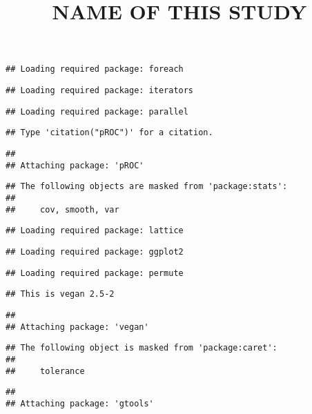 \documentclass[11pt,]{article}
\title{\textbf{NAME OF THIS STUDY}}
\author{}
\date{}
\begin{document}
\maketitle

\begin{verbatim}
## Loading required package: foreach
\end{verbatim}

\begin{verbatim}
## Loading required package: iterators
\end{verbatim}

\begin{verbatim}
## Loading required package: parallel
\end{verbatim}

\begin{verbatim}
## Type 'citation("pROC")' for a citation.
\end{verbatim}

\begin{verbatim}
## 
## Attaching package: 'pROC'
\end{verbatim}

\begin{verbatim}
## The following objects are masked from 'package:stats':
## 
##     cov, smooth, var
\end{verbatim}

\begin{verbatim}
## Loading required package: lattice
\end{verbatim}

\begin{verbatim}
## Loading required package: ggplot2
\end{verbatim}

\begin{verbatim}
## Loading required package: permute
\end{verbatim}

\begin{verbatim}
## This is vegan 2.5-2
\end{verbatim}

\begin{verbatim}
## 
## Attaching package: 'vegan'
\end{verbatim}

\begin{verbatim}
## The following object is masked from 'package:caret':
## 
##     tolerance
\end{verbatim}

\begin{verbatim}
## 
## Attaching package: 'gtools'
\end{verbatim}
\end{document}
